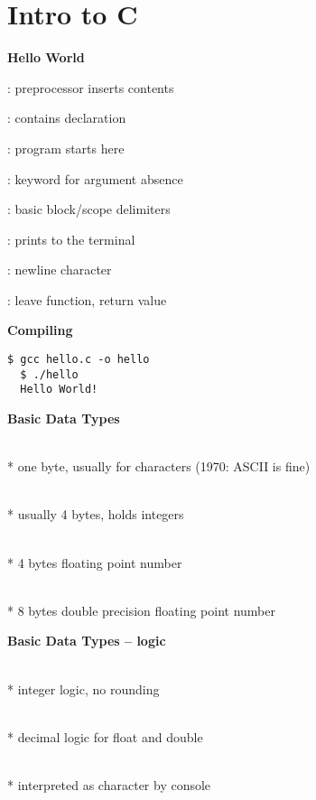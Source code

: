\section{Intro to C}

\textbf{Hello World}

\begin{items}
  \item {}: preprocessor inserts  contents
  \item {}: contains  declaration
  \item {}: program starts here
  \item {}: keyword for argument absence
  \item \code{\{  \}}: basic block/scope delimiters
  \item {}: prints to the terminal
  \item \code{\\n}: newline character
  \item {}: leave function, return value
\end{items}

\textbf{Compiling}
\begin{lstlisting}[style=custombash]
  $ gcc hello.c -o hello
  $ ./hello
  Hello World!
\end{lstlisting}

\textbf{Basic Data Types}
\begin{items}
  \item {} \\*
    one byte, usually for characters (1970: ASCII is fine)
  \item {} \\*
    usually 4 bytes, holds integers
  \item {} \\*
    4 bytes floating point number
  \item {} \\*
    8 bytes double precision floating point number
\end{items}

\textbf{Basic Data Types -- logic}
\begin{items}
  \item {} \\*
    integer logic, no rounding
  \item {} \\*
    decimal logic for float and double
  \item {} \\*
     interpreted as character by console
\end{items}

